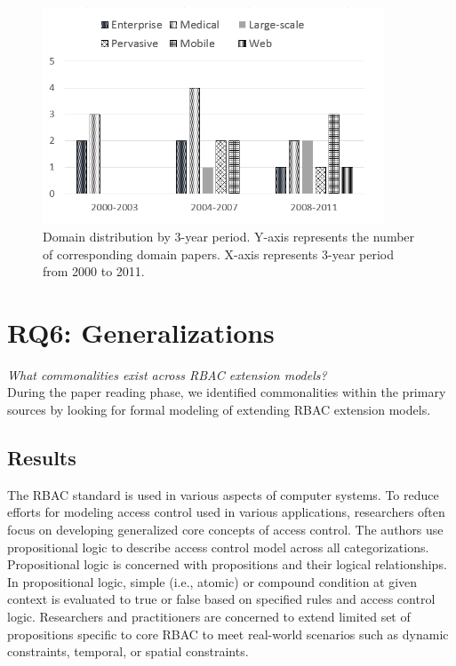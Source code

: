 
\begin{figure}[ht]
    \centering
        \includegraphics[width=4.0in]{sections/dist_domains_byYear.png}
\vspace{-0.2 in}
    \caption{\label{fig:dist_domains}Domain distribution by 3-year period. Y-axis represents the number of corresponding domain papers.
    X-axis represents 3-year period from 2000 to 2011.}
\end{figure}

\section{RQ6: Generalizations} \label{sec:generalizations}

\textit{What commonalities exist across RBAC extension models?}
\\

During the paper reading phase, we identified commonalities within the primary sources
by looking for formal modeling of extending RBAC extension models.

\subsection{Results}

The RBAC standard is used in various aspects of computer systems. To reduce efforts for modeling access control used in various applications, researchers often focus on developing generalized core concepts of access control.
The authors use propositional logic to describe access control model across all categorizations. Propositional logic is concerned with propositions and their logical relationships. In propositional logic, simple (i.e., atomic) or compound condition at given context is evaluated to true or false based on specified rules and access control logic. Researchers and practitioners are concerned to extend limited set of propositions specific to core RBAC to meet real-world scenarios such as dynamic constraints, temporal, or spatial constraints.

